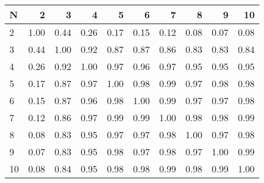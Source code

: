 \begin{tabular}{lrrrrrrrrr}
\toprule
N &    2  &    3  &    4  &    5  &    6  &    7  &    8  &    9  &    10 \\
\midrule
2  &  1.00 &  0.44 &  0.26 &  0.17 &  0.15 &  0.12 &  0.08 &  0.07 &  0.08 \\
3  &  0.44 &  1.00 &  0.92 &  0.87 &  0.87 &  0.86 &  0.83 &  0.83 &  0.84 \\
4  &  0.26 &  0.92 &  1.00 &  0.97 &  0.96 &  0.97 &  0.95 &  0.95 &  0.95 \\
5  &  0.17 &  0.87 &  0.97 &  1.00 &  0.98 &  0.99 &  0.97 &  0.98 &  0.98 \\
6  &  0.15 &  0.87 &  0.96 &  0.98 &  1.00 &  0.99 &  0.97 &  0.97 &  0.98 \\
7  &  0.12 &  0.86 &  0.97 &  0.99 &  0.99 &  1.00 &  0.98 &  0.98 &  0.99 \\
8  &  0.08 &  0.83 &  0.95 &  0.97 &  0.97 &  0.98 &  1.00 &  0.97 &  0.98 \\
9  &  0.07 &  0.83 &  0.95 &  0.98 &  0.97 &  0.98 &  0.97 &  1.00 &  0.99 \\
10 &  0.08 &  0.84 &  0.95 &  0.98 &  0.98 &  0.99 &  0.98 &  0.99 &  1.00 \\
\bottomrule
\end{tabular}
